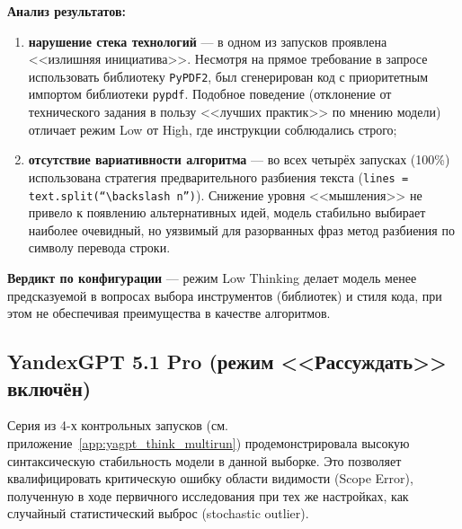 \textbf{Анализ результатов:}
\begin{enumerate}
    \item \textbf{нарушение стека технологий} --- в одном из запусков проявлена <<излишняя инициатива>>. Несмотря на прямое требование в запросе использовать библиотеку \texttt{PyPDF2}, был сгенерирован код с приоритетным импортом библиотеки \texttt{pypdf}. Подобное поведение (отклонение от технического задания в пользу <<лучших практик>> по мнению модели) отличает режим Low от High, где инструкции соблюдались строго;
    
    \item \textbf{отсутствие вариативности алгоритма} --- во всех четырёх запусках (100\%) использована стратегия предварительного разбиения текста (\texttt{lines = text.split(``$\backslash n$'')}). Снижение уровня <<мышления>> не привело к появлению альтернативных идей, модель стабильно выбирает наиболее очевидный, но уязвимый для разорванных фраз метод разбиения по символу перевода строки.
\end{enumerate}

\textbf{Вердикт по конфигурации} --- режим Low Thinking делает модель менее предсказуемой в вопросах выбора инструментов (библиотек) и стиля кода, при этом не обеспечивая преимущества в качестве алгоритмов.

\subsection{YandexGPT 5.1 Pro (режим <<Рассуждать>> включён)}

Серия из 4-х контрольных запусков (см. приложение~\ref{app:yagpt_think_multirun}) продемонстрировала высокую синтаксическую стабильность модели в данной выборке. Это позволяет квалифицировать критическую ошибку области видимости (Scope Error), полученную в ходе первичного исследования при тех же настройках, как случайный статистический выброс (stochastic outlier).

